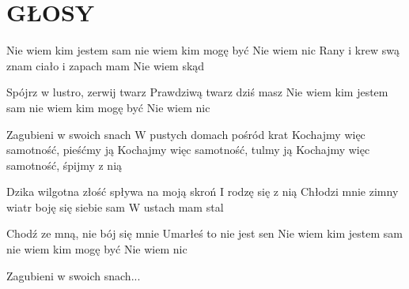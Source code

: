 \documentclass[../../../songbook.tex]{subfiles}
\begin{document}
\TabPositions{8cm} %
\section*{GŁOSY}
{}
\vspace{0.5cm}
Nie wiem kim jestem sam nie wiem kim mogę być	 \newline
Nie wiem nic									 \newline
Rany i krew swą znam ciało i zapach mam			 \newline
Nie wiem skąd										 \newline

Spójrz w lustro, zerwij twarz						 \newline
Prawdziwą twarz dziś masz									 \newline
Nie wiem kim jestem sam nie wiem kim mogę być			 \newline
Nie wiem nic							 \newline

\-\hspace{1cm} Zagubieni w swoich snach					 \newline
\-\hspace{1cm} W pustych domach pośród krat				 \newline
\-\hspace{1cm} Kochajmy więc samotność, pieśćmy ją		 \newline
\-\hspace{1cm} Kochajmy więc samotność, tulmy ją		 \newline
\-\hspace{1cm} Kochajmy więc samotność, śpijmy z nią	 \newline

Dzika wilgotna złość spływa na moją skroń					 \newline
I rodzę się z nią												 \newline
Chłodzi mnie zimny wiatr boję się siebie sam				 \newline
W ustach mam stal													 \newline

Chodź ze mną, nie bój się mnie			 \newline
Umarłeś to nie jest sen			 \newline
Nie wiem kim jestem sam nie wiem kim mogę być			 \newline
Nie wiem nic			 \newline

\-\hspace{1cm} Zagubieni w swoich snach...			 \newline
\end{document}
